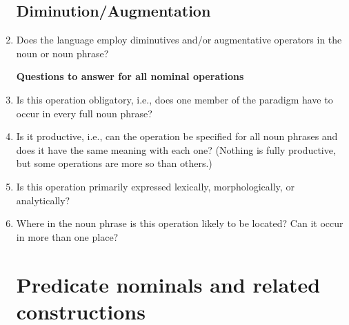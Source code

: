 \documentclass[twocolumn]{scrartcl}
\newcommand{\productive}{(Nothing is fully productive, but some operations are more so than others.)}
\begin{document}
\begin{enumerate}[resume]
\subsection{Diminution/Augmentation}
\item Does the language employ diminutives and/or augmentative operators in the noun or noun phrase?

\textbf{Questions to answer for all nominal operations}
\item Is this operation obligatory, i.e., does one member of the paradigm have to occur in every full noun phrase?
\item Is it productive, i.e., can the operation be specified for all noun phrases and does it have the same meaning with each one? \productive
\item Is this operation primarily expressed lexically, morphologically, or analytically?
\item Where in the noun phrase is this operation likely to be located? Can it occur in more than one place?
\section{Predicate nominals and related constructions}
\end{enumerate}
\end{document}
